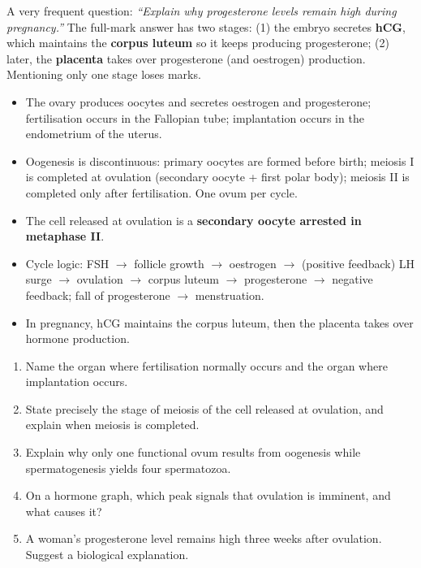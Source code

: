 \documentclass[11pt]{article}
\begin{document}
\begin{attention}
A very frequent question: \emph{``Explain why progesterone levels remain high during pregnancy.''} The full-mark answer has two stages: (1) the embryo secretes \textbf{hCG}, which maintains the \textbf{corpus luteum} so it keeps producing progesterone; (2) later, the \textbf{placenta} takes over progesterone (and oestrogen) production. Mentioning only one stage loses marks.
\end{attention}

\begin{aretenir}
\begin{itemize}
\item The ovary produces oocytes and secretes oestrogen and progesterone; fertilisation occurs in the Fallopian tube; implantation occurs in the endometrium of the uterus.
\item Oogenesis is discontinuous: primary oocytes are formed before birth; meiosis I is completed at ovulation (secondary oocyte + first polar body); meiosis II is completed only after fertilisation. One ovum per cycle.
\item The cell released at ovulation is a \textbf{secondary oocyte arrested in metaphase II}.
\item Cycle logic: FSH $\rightarrow$ follicle growth $\rightarrow$ oestrogen $\rightarrow$ (positive feedback) LH surge $\rightarrow$ ovulation $\rightarrow$ corpus luteum $\rightarrow$ progesterone $\rightarrow$ negative feedback; fall of progesterone $\rightarrow$ menstruation.
\item In pregnancy, hCG maintains the corpus luteum, then the placenta takes over hormone production.
\end{itemize}
\end{aretenir}

\begin{exercice}
\begin{enumerate}
\item Name the organ where fertilisation normally occurs and the organ where implantation occurs.
\item State precisely the stage of meiosis of the cell released at ovulation, and explain when meiosis is completed.
\item Explain why only one functional ovum results from oogenesis while spermatogenesis yields four spermatozoa.
\item On a hormone graph, which peak signals that ovulation is imminent, and what causes it?
\item A woman's progesterone level remains high three weeks after ovulation. Suggest a biological explanation.
\end{enumerate}
\end{exercice}
\end{document}
